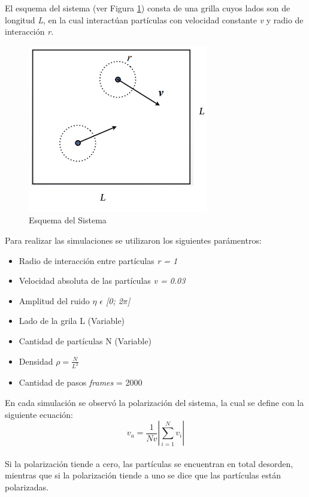 \documentclass[12pt, a4paper]{report}
\begin{document}
El esquema del sistema (ver Figura \ref{fig:esquema}) consta de una grilla cuyos lados son de longitud \emph{L}, en la cual interactúan partículas con velocidad constante \emph{v} y radio de interacción \emph{r}.

\begin{figure}[h]
\includegraphics[scale=0.42]{esquema.png}
\centering 
\caption{Esquema del Sistema}
\label{fig:esquema}
\end{figure}

\pagebreak
Para realizar las simulaciones se utilizaron los siguientes parámentros: 
\begin{itemize}
    \item Radio de interacción entre partículas \emph{r = 1}
    \item Velocidad absoluta de las partículas \emph{v = 0.03}
    \item Amplitud del ruido \emph{$\eta$ $\epsilon$ [0; 2$\pi$]} 
    \item Lado de la grila L (Variable) 
    \item Cantidad de partículas N (Variable)
    \item Densidad $\rho = \frac{N}{L^2}$
    \item Cantidad de pasos \emph{frames} = 2000  
\end{itemize}

En cada simulación se observó la polarización del sistema, la cual se define con la siguiente ecuación: 
\begin{equation}
    \label{eq:polarization}
     v_a = \frac{1}{Nv} \left\lvert \sum_{i = 1}^{N} v_i \right\rvert
\end{equation}\\

Si la polarización tiende a cero, las partículas se encuentran en total desorden, mientras que si la polarización tiende a uno se dice que las partículas están polarizadas.\\
\end{document}
